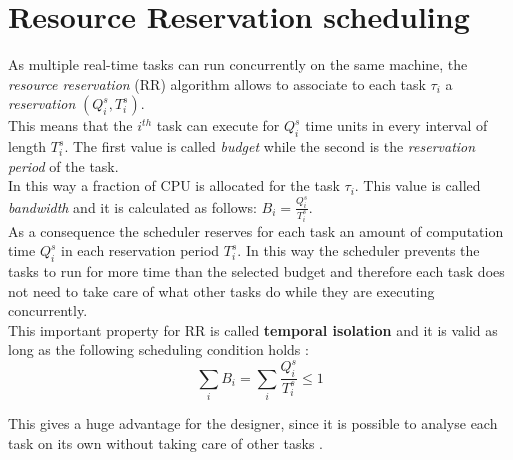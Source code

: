 \section{Resource Reservation scheduling}
As multiple real-time tasks can run concurrently on the same machine, the \emph{resource reservation} (RR) \cite{hardrealtime} algorithm allows to associate to each task \( \tau_{i} \) a \emph{reservation} \( \left(Q_{i}^s, T_{i}^s\right) \).\\ 
This means that the \( i^{th} \) task can execute for \( Q_{i}^s \) time units in every interval of length \( T_{i}^s \). The first value is called \emph{budget} while the second is the \emph{reservation period} of the task.\\
In this way a fraction of CPU is allocated for the task \( \tau_{i} \). This value is called \emph{bandwidth} and it is calculated as follows: \( B_{i} = \frac{Q_{i}^s}{T_{i}^s}\).\\
As a consequence the scheduler reserves for each task an amount of computation time \( Q_{i}^s \) in each reservation period \( T_{i}^s \). In this way the scheduler prevents the tasks to run for more time than the selected budget and therefore each task does not need to take care of what other tasks do while they are executing concurrently.\\
This important property for RR is called \textbf{temporal isolation} and it is valid as long as the following scheduling condition holds \cite{realtimehandbook}:
\begin{equation} \tag{1} \label{schedCond}
  \displaystyle\sum_{i} B_{i} =  \displaystyle\sum_{i} \frac{Q_{i}^s}{T_{i}^s} \leq 1
\end{equation}

This gives a huge advantage for the designer, since it is possible to analyse each task on its own without taking care of other tasks \cite{probGuarantees}.

